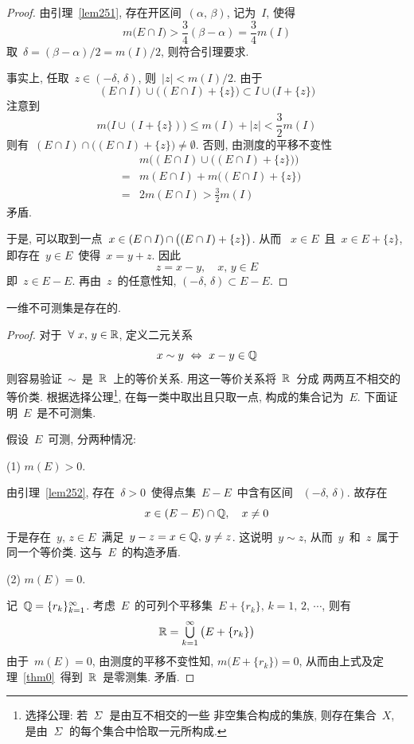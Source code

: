 \begin{proof}
由引理~\ref{lem251}, 存在开区间~$(\alpha,\,\beta)$, 记为~$I$, 使得
\[
m\big(E \cap I \big) > \frac{3}{4}(\beta - \alpha) = \frac{3}{4} m(I)
\]
取~$\delta = (\beta-\alpha)/2 = m(I)/2$, 则符合引理要求.

事实上, 任取~$z \in (-\delta,\,\delta)$, 则~$|z| < m(I)/2$. 由于
\[
(E \cap I) \cup \big((E \cap I) + \{z\}\big) \subset I \cup \big(I + \{z\}\big)
\]
注意到
\[
m\big(I \cup (I + \{z\})\big) \leqslant m(I) + |z| < \frac{3}{2}m(I)
\]
则有~$(E \cap I) \cap \big((E \cap I)+\{z\}\big) \neq \emptyset$. 否则,
由测度的平移不变性
\begin{eqnarray*}
&& m\big( (E \cap I) \cup \big((E \cap I)+\{z\}\big) \big) \\
&=& m(E \cap I) + m\big((E \cap I) + \{z\}\big) \\
&=&2 m(E \cap I) > \frac{3}{2}m(I)
\end{eqnarray*}
矛盾.

于是, 可以取到一点~$x \in (E \cap I) \mathop{\cap} \big((E \cap I)+\{z\}\big)$. 从而
~$x \in E$~且~$x \in E + \{z\}$, 即存在~$y \in E$~使得~$x = y + z$. 因此
\[
z = x - y, \quad x,\,y \in E
\]
即~$z \in E - E$. 再由~$z$~的任意性知, $(-\delta,\,\delta) \subset E - E$.
\end{proof}

\begin{theorem}
一维不可测集是存在的.
\end{theorem}

\begin{proof}
对于~$\forall~x,\,y \in \mathbb{R}$, 定义二元关系
\[
x \sim y ~\Leftrightarrow~ x - y \in \mathbb{Q}
\]
则容易验证~$\sim$~是~$\mathbb{R}$~上的等价关系. 用这一等价关系将~$\mathbb{R}$~分成
两两互不相交的等价类. 根据选择公理\footnote{选择公理: 若~${\mathnormal\Sigma}$~是由互不相交的一些
非空集合构成的集族, 则存在集合~$X$, 是由~${\mathnormal\Sigma}$~的每个集合中恰取一元所构成. },
在每一类中取出且只取一点, 构成的集合记为~$E$.
下面证明~$E$~是不可测集.

假设~$E$~可测, 分两种情况:

(1) $m(E) > 0$.

由引理~\ref{lem252}, 存在~$\delta > 0$~使得点集~$E - E$~中含有区间
~$(-\delta,\,\delta)$. 故存在
\[
x \in (E - E) \cap \mathbb{Q}, \quad x \neq 0
\]
于是存在~$y,\,z \in E$~满足~$y - z = x \in \mathbb{Q}, \, y \neq z$. 这说明~$y \sim z$,
从而~$y$~和~$z$~属于同一个等价类. 这与~$E$~的构造矛盾.

(2) $m(E) = 0$.

记~$\mathbb{Q} = \{r_k\}_{k=1}^\infty$. 考虑~$E$~的可列个平移集~$E + \{r_k\}, \,
k=1,\,2,\,\cdots$, 则有
\[
\mathbb{R} = \mathop{\textstyle{\bigcup}}_{k=1}^\infty \big(E + \{r_k\}\big)
\]
由于~$m(E) = 0$, 由测度的平移不变性知, $m\big(E + \{r_k\}\big) = 0$,
从而由上式及定理~\ref{thm0}~得到~$\mathbb{R}$~是零测集. 矛盾.
\end{proof}

